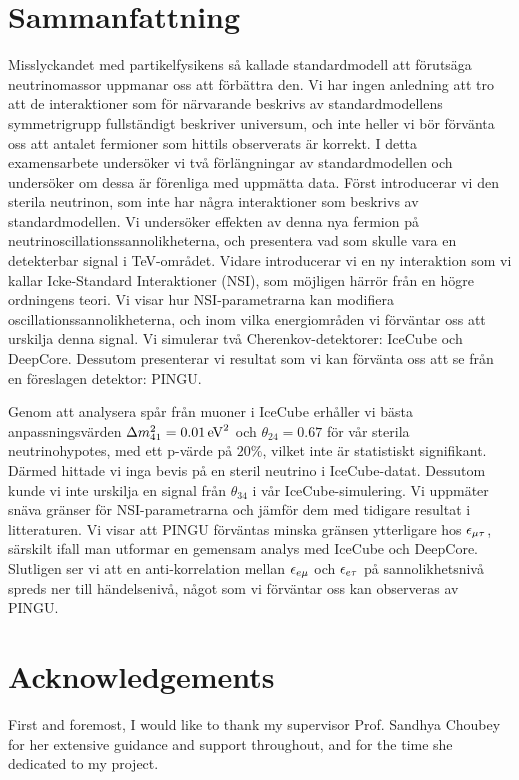 \chapter*{Sammanfattning}
Misslyckandet med partikelfysikens så kallade standardmodell att förutsäga neutrinomassor uppmanar oss att förbättra den. Vi har ingen anledning att tro att
de interaktioner som för närvarande beskrivs av standardmodellens symmetrigrupp fullständigt beskriver universum, och inte heller vi bör förvänta oss att antalet fermioner som hittils observerats
är korrekt.
I detta examensarbete undersöker vi två förlängningar av standardmodellen och undersöker om dessa är förenliga med uppmätta data.
Först introducerar vi den sterila neutrinon, som inte har några interaktioner som beskrivs av standardmodellen. Vi undersöker effekten av denna
nya fermion på neutrinoscillationssannolikheterna, och presentera vad som skulle vara en detekterbar signal i \si{\TeV}-området.
Vidare introducerar vi en ny interaktion som vi kallar Icke-Standard Interaktioner (NSI), som möjligen härrör från en högre ordningens teori.
Vi visar hur NSI-parametrarna kan modifiera oscillationssannolikheterna, och inom vilka energiområden vi förväntar oss att urskilja denna signal.
Vi simulerar två Cherenkov-detektorer: IceCube och DeepCore. Dessutom presenterar vi resultat som vi
kan förvänta oss att se från en föreslagen detektor: PINGU.

Genom att analysera spår från muoner i IceCube erhåller vi bästa anpassningsvärden $\dm[41] = \SI{0.01}{\eV^2}$ och $\theta_{24} = 0.67$ för vår sterila neutrinohypotes, med
ett p-värde på $20\%$, vilket inte är statistiskt signifikant. Därmed hittade vi inga bevis på en steril neutrino i IceCube-datat.
Dessutom kunde vi inte urskilja en signal från $\theta_{34}$ i vår IceCube-simulering.
Vi uppmäter snäva gränser för NSI-parametrarna och jämför dem med tidigare resultat i litteraturen. Vi visar att PINGU förväntas minska gränsen ytterligare
hos $\epsilon_{\mu\tau}$, särskilt ifall man utformar en gemensam analys med IceCube och DeepCore. Slutligen ser vi att en anti-korrelation mellan
$\epsilon_{e\mu}$ och $\epsilon_{e\tau}$ på sannolikhetsnivå spreds ner till händelsenivå, något som vi förväntar oss kan observeras av PINGU.

\chapter*{Acknowledgements}
First and foremost, I would like to thank my supervisor Prof. Sandhya Choubey for her extensive guidance and support throughout,
and for the time she dedicated to my project. 

